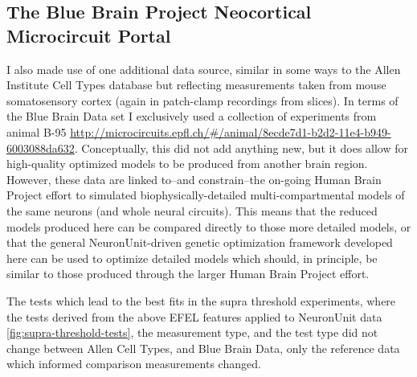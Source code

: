 \subsection{The Blue Brain Project Neocortical Microcircuit Portal}
I also made use of one additional data source, similar in some ways to the Allen Institute Cell Types database but reflecting measurements taken from mouse somatosensory cortex (again in patch-clamp recordings from slices). In terms of the Blue Brain Data set I exclusively used a collection of experiments from animal B-95 \url{http://microcircuits.epfl.ch/#/animal/8ecde7d1-b2d2-11e4-b949-6003088da632}.
Conceptually, this did not add anything new, but it does allow for high-quality optimized models to be produced from another brain region.
However, these data are linked to--and constrain--the on-going Human Brain Project effort to simulated biophysically-detailed multi-compartmental models of the same neurons (and whole neural circuits).
This means that the reduced models produced here can be compared directly to those more detailed models, or that the general NeuronUnit-driven genetic optimization framework developed here can be used to optimize detailed models which should, in principle, be similar to those produced through the larger Human Brain Project effort.

The tests which lead to the best fits in the supra threshold experiments, where the tests derived from the above EFEL features applied to NeuronUnit data \ref{fig:supra-threshold-tests}, the measurement type, and the test type did not change between Allen Cell Types, and Blue Brain Data, only the reference data which informed comparison measurements changed.

